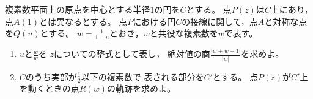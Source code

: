 \documentclass[../../main.tex]{subfiles}
\begin{document}
複素数平面上の原点を中心とする半径1の円を$C$とする。
点$P(z)$は$C$上にあり，点$A(1)$とは異なるとする。
点$P$における円$C$の接線に関して，点$A$と対称な点を$Q(u)$とする。
$\displaystyle w=\frac{1}{1-u}$とおき，$w$と共役な複素数を$\overline{w}$で表す。
\begin{enumerate}
  \item$u$と$\displaystyle\frac{\overline{w}}{w}$を
    $z$についての整式として表し，
    絶対値の商$\displaystyle\frac{|w+\overline{w}-1|}{|w|}$を求めよ。
  \item$C$のうち実部が$\displaystyle\frac{1}{2}$以下の複素数で
    表される部分を$C'$とする。
    点$P(z)$が$C'$上を動くときの点$R(w)$の軌跡を求めよ。
\end{enumerate}
\end{document}
